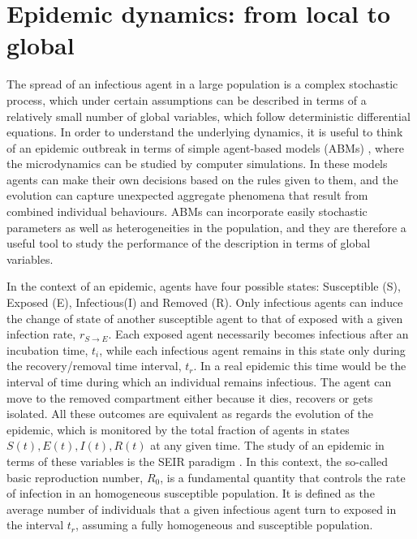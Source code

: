 \documentclass[10pt,letterpaper]{article}
\begin{document}




\section*{Epidemic dynamics: from local to global}
\label{sec:ABM}

The spread of an infectious agent in a large population is a complex stochastic process, which under certain assumptions can be described in terms of a relatively small number of global variables, which follow deterministic differential equations. In order to understand the underlying dynamics, it is useful to think of an epidemic outbreak in terms of simple 
agent-based models (ABMs) \cite{Hunter2017}, where the microdynamics can be studied by computer simulations. In these models 
 agents can make their own decisions based on the rules given to them, and the evolution can capture unexpected aggregate phenomena that result from combined individual behaviours. ABMs can incorporate easily stochastic parameters as well as heterogeneities in the population, and they are therefore a useful tool to study the performance of the description in terms of global variables.

In the context of an epidemic, agents have four possible states: Susceptible (S), Exposed (E), Infectious(I) and Removed (R). Only infectious agents can induce the change of state of another susceptible agent to that of exposed with a given infection rate, $r_{S\rightarrow E}$. Each exposed agent necessarily becomes infectious after an incubation time, $t_i$, while each infectious agent remains in this state only during the recovery/removal time interval, $t_r$. In a real epidemic this time would be the interval of time during which an individual remains infectious. The agent can move to the removed compartment either because it dies, recovers or gets isolated. All these outcomes are equivalent as regards the evolution of the epidemic, which  is monitored by the total fraction of agents in states $S(t), E(t), I(t), R(t)$ at any given time. The study of an epidemic in terms of these variables is the SEIR paradigm \cite{Kermack1927}.  In this context, the so-called basic reproduction number, $R_0$, is a fundamental quantity that controls the rate of infection in an homogeneous susceptible population. It is defined as the average number of individuals that a given infectious agent turn to exposed in the interval $t_r$, assuming a fully homogeneous and susceptible population. 
 
\end{document}
